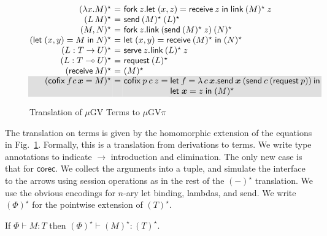\documentclass[orivec,envcountsame]{llncs}
\makeatletter
\newcommand{\gvdual}[1]{\overline{#1}}
\newcommand{\lto}{\ensuremath{\multimap}}
\newcommand{\uto}{\ensuremath{\rightarrow}}
\newcommand{\outterm}{\mkwd{end}_!}
\newcommand{\gvtyp}[3]{#1 \vdash #2 : #3}
\newcommand{\mkwd}[1]{\mathsf{#1}}
\newcommand{\gvsend}[2]{\mkwd{send}\:#1\:#2}
\newcommand{\gvreceive}[1]{\mkwd{receive}\:#1}
\newcommand{\gvlet}[3]{\mkwd{let}\;#1 = #2\;\mkwd{in}\;#3}
\newcommand{\gvlink}[2]{\mkwd{link}\:#1\:#2}
\newcommand{\gvfork}[2]{\mkwd{fork}\:#1.#2}
\newcommand{\lrkwd}{\mkwd{cofix}}
\newcommand{\gvfix}[3]{\lrkwd\:#1\:#2 = #3}
\newcommand{\gvserve}[2]{\mkwd{serve}\:#1.#2}
\newcommand{\gvrequest}[1]{\mkwd{request}\:#1}
\newcommand{\key}{\mkwd}
\newcommand{\cofix}{\lrkwd}
\newcommand{\topi}[1]{({#1})^\star}
\newcommand{\mugv}{$\mu\mathrm{GV}$\xspace}
\newcommand{\gvpi}{$\mu\mathrm{GV}\pi$\xspace}
\newcommand{\ba}{\begin{array}}
\newcommand{\ea}{\end{array}}
\newcommand{\bl}{\ba[t]{@{}l@{}}}
\newcommand{\el}{\ea}
\newenvironment{equations}{\[\ba{@{}r@{~}c@{~}l@{}}}{\ea\]}
\newcommand\shaderow{\noalign{\vskip-0.4pt}\rowcolor{shade}[0.6mm]}
\makeatother
\begin{document}
\begin{figure}[float]
\vspace{-2mm}
\small
\begin{equations}
\topi{\lambda x.M} &=& \gvfork{z}{\gvlet{(x, z)}{\gvreceive{z}}{\gvlink{\topi{M}}{z}}} \\
\topi{L\,M} &=& \gvsend{\topi{M}}{\topi{L}} \\
\topi{M, N} &=&
  \gvfork{z}
    {\gvlink{(\gvsend{\topi{M}}{z})}{\topi{N}}} \\
\topi{\gvlet{(x, y)}{M}{N}} &=&
    \gvlet{(x, y)}{\gvreceive{\topi{M}}}{\topi{N}} \\
\topi{L : T \uto U} &=&
  \gvserve{z}{\gvlink{\topi{L}}{z}} \\
\topi{L : T \lto U} &=& \gvrequest{\topi{L}} \\
\topi{\gvreceive{M}} &=& \topi{M}
\\ \shaderow
\topi{\gvfix{f}{\!c\,\vec{x}}{M}} &=&
   \cofix\:p\:c\:z =
     \bl
     \key{let}\:f = \lambda\,c\,\vec{x}.\gvsend{\vec{x}}{(\gvsend{c}{(\gvrequest{p})})}\:\key{in} \\
     \gvlet{\vec{x}}{z}{\topi{M}} \\
     \el \\
\end{equations}%
\vspace{-2mm}
\caption{Translation of \mugv Terms to \gvpi}\label{fig:togvpi}
\end{figure}

The translation on terms is given by the homomorphic extension of the equations in
Fig.~\ref{fig:togvpi}. Formally, this is a translation from derivations to terms. We write type
annotations to indicate $\to$ introduction and elimination.
%
The only new case is that for $\key{corec}$. We collect the arguments into a tuple, and simulate the
interface to the arrows using session operations as in the rest of the $\topi{-}$ translation.
%
We use the obvious encodings for $n$-ary let binding, lambdas, and send.
%
We write $\topi{\Phi}$ for the pointwise extension of $\topi{T}$.
\begin{theorem}
If $\gvtyp{\Phi}{M}{T}$ then $\gvtyp{\topi{\Phi}}{\topi{M}}{\topi{T}}$.
\end{theorem}
\end{document}
